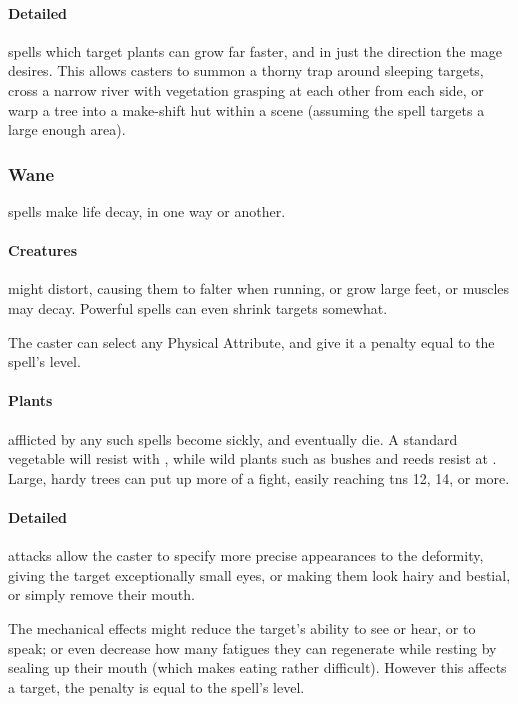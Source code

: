 \begin{multicols}{2}
\paragraph{Detailed}
spells which target plants can grow far faster, and in just the direction the mage desires.
This allows casters to summon a thorny trap around sleeping targets, cross a narrow river with vegetation grasping at each other from each side, or warp a tree into a make-shift hut within a scene (assuming the spell targets a large enough area).

\subsubsection{Wane}
spells make life decay, in one way or another.

  \paragraph{Creatures}
    might distort, causing them to falter when running, or grow large feet, or muscles may decay.
    Powerful spells can even shrink targets somewhat.

    The caster can select any Physical Attribute, and give it a penalty equal to the spell's level.

  \paragraph{Plants}
    afflicted by any such spells become sickly, and eventually die.
    A standard vegetable will resist with \tn[4], while wild plants such as bushes and reeds resist at \tn[7].
    Large, hardy trees can put up more of a fight, easily reaching \glspl{tn} 12, 14, or more.

  \paragraph{Detailed}
    attacks allow the caster to specify more precise appearances to the deformity, giving the target exceptionally small eyes, or making them look hairy and bestial, or simply remove their mouth.

    The mechanical effects might reduce the target's ability to see or hear, or to speak; or even decrease how many \glspl{fatigue} they can regenerate while resting by sealing up their mouth (which makes eating rather difficult).
    However this affects a target, the penalty is equal to the spell's level.


\end{multicols}
